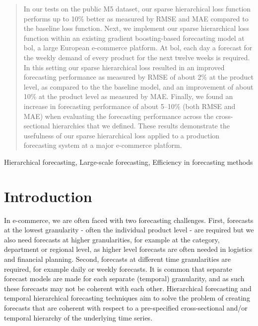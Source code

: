 \documentclass[preprint, 3p, times, twocolumn]{elsarticle}
\begin{document}
\begin{frontmatter}
\begin{abstract}
  In our tests on the public M5 dataset, our sparse hierarchical loss function performs up to 10\% better as measured by RMSE and MAE compared to the baseline loss function. Next, we implement our sparse hierarchical loss function within an existing gradient boosting-based forecasting model at bol, a large European e-commerce platform. At bol, each day a forecast for the weekly demand of every product for the next twelve weeks is required. In this setting our sparse hierarchical loss resulted in an improved forecasting performance as measured by RMSE of about 2\% at the product level, as compared to the the baseline model, and an improvement of about 10\% at the product level as measured by MAE. Finally, we found an increase in forecasting performance of about 5--10\% (both RMSE and MAE) when evaluating the forecasting performance across the cross-sectional hierarchies that we defined. These results demonstrate the usefulness of our sparse hierarchical loss applied to a production forecasting system at a major e-commerce platform.

\end{abstract}

\begin{keyword}
  Hierarchical forecasting, Large-scale forecasting, Efficiency in forecasting methods
\end{keyword}

\end{frontmatter}

\section{Introduction} \label{sec:intro}
In e-commerce, we are often faced with two forecasting challenges. First, forecasts at the lowest granularity - often the individual product level - are required but we also need forecasts at higher granularities, for example at the category, department or regional level, as higher level forecasts are often needed in logistics and financial planning. Second, forecasts at different time granularities are required, for example daily or weekly forecasts. It is common that separate forecast models are made for each separate (temporal) granularity, and as such these forecasts may not be coherent with each other. Hierarchical forecasting \cite{hyndman_optimal_2011} and temporal hierarchical forecasting techniques \cite{athanasopoulos_forecasting_2017,rangapuram_coherent_2023,theodosiou_forecasting_2021} aim to solve the problem of creating forecasts that are coherent with respect to a pre-specified cross-sectional and/or temporal hierarchy of the underlying time series. 
\end{document}
